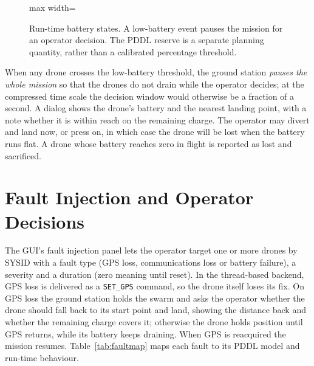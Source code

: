 \documentclass[11pt,a4paper,oneside]{report}
\newcommand{\code}[1]{\texttt{#1}}
\begin{document}
\begin{figure}[H]
\centering
\begin{adjustbox}{max width=\linewidth}
\end{adjustbox}
\caption[Battery states and reserve]{Run-time battery states. A low-battery event
pauses the mission for an operator decision. The PDDL reserve is a separate
planning quantity, rather than a calibrated percentage threshold.}
\label{fig:battery}
\end{figure}

\noindent When any drone crosses the low-battery threshold, the ground station \emph{pauses the
whole mission} so that the drones do not drain while the operator decides; at the compressed time
scale the decision window would otherwise be a fraction of a second. A dialog shows the drone's
battery and the nearest landing point, with a note whether it is within reach on the remaining
charge. The operator may divert and land now, or press on, in which case the drone will be lost
when the battery runs flat. A drone whose battery reaches zero in flight is reported as lost and
sacrificed.

\section{Fault Injection and Operator Decisions}
The GUI's fault injection panel lets the operator target one or more drones by SYSID with a
fault type (GPS loss, communications loss or battery failure), a severity and a duration
(zero meaning until reset). In the thread-based backend, GPS loss is delivered as a
\code{SET\_GPS} command, so the drone itself loses its fix. On GPS loss the ground station holds
the swarm and asks the operator whether the drone should fall back to its start point and land,
showing the distance back and whether the remaining charge covers it; otherwise the drone holds
position until GPS returns, while its battery keeps draining. When GPS is reacquired the mission
resumes. Table~\ref{tab:faultmap} maps each fault to its PDDL model and run-time behaviour.
\end{document}
